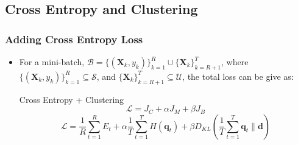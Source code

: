 \subsection{Cross Entropy and Clustering}
\begin{frame}
	\frametitle{Adding Cross Entropy Loss}
	\begin{itemize}
		\item For a mini-batch, $\mathcal{B} = \{(\mathbf{X}_k, y_k)\}_{k=1}^R \cup
			\{\mathbf{X}_k\}_{k=R+1}^T$, where $\{(\mathbf{X}_k, y_k)\}_{k=1}^{R} \subseteq
			\mathcal{S}$, and $\{\mathbf{X}_k\}_{k=R+1}^{T} \subseteq \mathcal{U}$, the total loss
			can be give as:
			\begin{block}{Cross Entropy + Clustering}
				\begin{equation*}
					\mathcal{L} = J_C + \alpha J_M + \beta J_B
				\end{equation*}
				\begin{equation*}
					\mathcal{L} = \frac{1}{R} \sum_{t=1}^{R} E_t + \alpha \frac{1}{T}\sum_{t=1}^{T}H(\mathbf{q}_t) +
					\beta D_{KL}(\frac{1}{T}\sum_{t=1}^{T}\mathbf{q}_t \lVert \mathbf{d})
				\end{equation*}
			\end{block}
	\end{itemize}
\end{frame}


